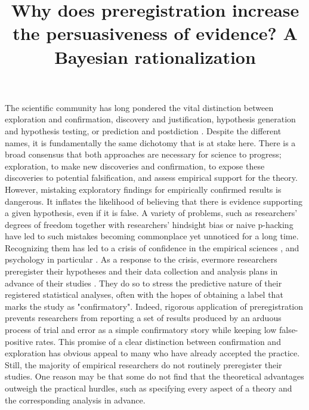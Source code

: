 \documentclass[jou,a4paper]{apa7}
\title{Why does preregistration increase the persuasiveness of evidence? A Bayesian rationalization}
\begin{document}
\maketitle %
\thispagestyle{firststyle}

The scientific community has long pondered the vital distinction between exploration and confirmation, discovery and justification, hypothesis generation and hypothesis testing, or prediction and postdiction  \parencite{hoyningen-hueneContextDiscoveryContext2006,shmueliExplainPredict2010,nosekPreregistrationRevolution2018,tukeyWeNeedBoth1980}.
Despite the different names, it is fundamentally the same dichotomy that is at stake here. There is a broad consensus that both approaches are necessary for science to progress; exploration, to make new discoveries and confirmation, to expose these discoveries to potential falsification, and assess empirical support for the theory. However, mistaking exploratory findings for empirically confirmed results is dangerous. It inflates the likelihood of believing that there is evidence supporting a given hypothesis, even if it is false. A variety of problems, such as researchers' degrees of freedom together with researchers' hindsight bias or naive p-hacking have led to such mistakes becoming commonplace yet unnoticed for a long time.
Recognizing them has led to a crisis of confidence in the empirical sciences \parencite{ioannidisWhyMostPublished2005}, and psychology in particular \parencite{opensciencecollaborationEstimatingReproducibilityPsychological2015}.
As a response to the crisis, evermore researchers preregister their hypotheses and their data collection and analysis plans in advance of their studies \parencite{nosekPreregistrationRevolution2018}.
They do so to stress the predictive nature of their registered statistical analyses, often with the hopes of obtaining a label that marks the study as "confirmatory".
Indeed, rigorous application of preregistration prevents researchers from reporting a set of results produced by an arduous process of trial and error as a simple confirmatory story \parencite{wagenmakersAgendaPurelyConfirmatory2012} while keeping low false-positive rates.
This promise of a clear distinction between confirmation and exploration has obvious appeal to many who have already accepted the practice.
Still, the majority of empirical researchers do not routinely preregister their studies.
One reason may be that some do not find that the theoretical advantages outweigh the practical hurdles, such as specifying every aspect of a theory and the corresponding analysis in advance.
\end{document}
